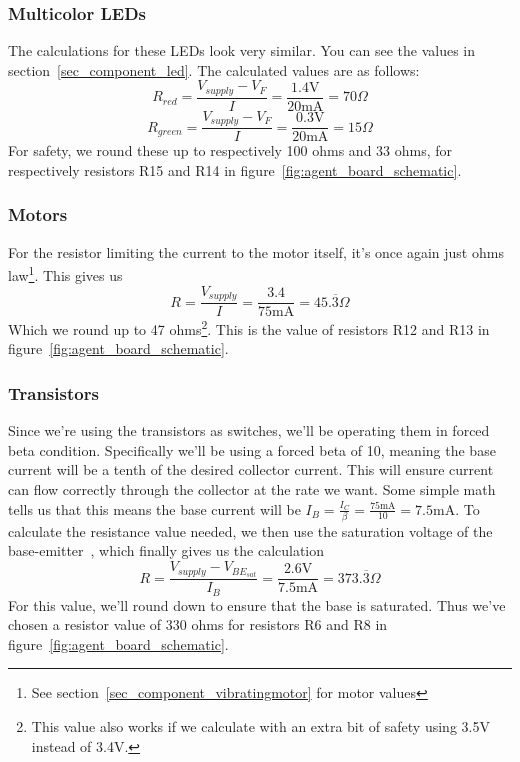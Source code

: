 \documentclass[acmsmall]{acmart}
\begin{document}
\subsubsection{Multicolor LEDs}
The calculations for these LEDs look very similar. You can see the values in section~\ref{sec_component_led}. The calculated values are as follows:
\[
	R_{red}=\frac{V_{supply}-V_F}{I}=\frac{1.4\text{V}}{20\text{mA}}=70\Omega
\]
\[
	R_{green}=\frac{V_{supply}-V_F}{I}=\frac{0.3\text{V}}{20\text{mA}}=15\Omega
\]
For safety, we round these up to respectively 100 ohms and 33 ohms, for respectively resistors R15 and R14 in figure~\ref{fig:agent_board_schematic}.

\subsubsection{Motors}
For the resistor limiting the current to the motor itself, it's once again just ohms law\footnote{See section~\ref{sec_component_vibratingmotor} for motor values}.
This gives us
\[
	R=\frac{V_{supply}}{I}=\frac{3.4}{75\text{mA}}=45.\overline{3}\Omega
\]
Which we round up to 47 ohms\footnote{This value also works if we calculate with an extra bit of safety using 3.5V instead of 3.4V.}. This is the value of resistors
R12 and R13 in figure~\ref{fig:agent_board_schematic}.

\subsubsection{Transistors}
Since we're using the transistors as switches, we'll be operating them in forced beta condition. Specifically we'll be using a forced beta of 10, meaning
the base current will be a tenth of the desired collector current. This will ensure current can flow correctly through the collector at the rate we want.
Some simple math tells us that this means the base current will be $I_B=\frac{I_C}{\beta}=\frac{75\text{mA}}{10}=7.5\text{mA}$. To calculate the resistance value
needed, we then use the saturation voltage of the base-emitter~\cite[][p.1]{transistor}, which finally gives us the calculation
\[
	R=\frac{V_{supply}-V_{BE_{sat}}}{I_B}=\frac{2.6\text{V}}{7.5\text{mA}}=373.\overline{3}\Omega
\]
For this value, we'll round down to ensure that the base is saturated. Thus we've chosen a resistor value of 330 ohms for resistors
R6 and R8 in figure~\ref{fig:agent_board_schematic}.
\end{document}
